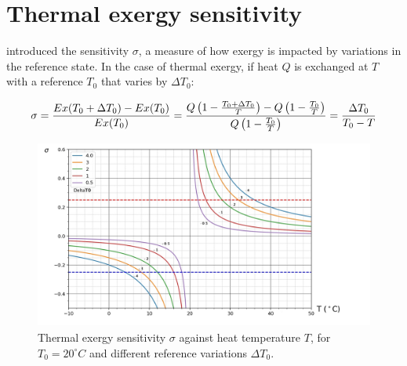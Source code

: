 \documentclass[10pt]{extarticle} %
\begin{document}
\section{Thermal exergy sensitivity} \label{sec:sensitivity}

\cite{Rosen2004} introduced the sensitivity $\sigma$, a measure of how exergy is impacted by variations in the reference state. In the case of thermal exergy, if heat $Q$ is exchanged at $T$ with a reference $T_0$ that varies by $\Delta T_0$: 





\vskip-0.1cm
\begin{equation}
\sigma =  {Ex(T_0+\Delta T_0)-Ex(T_0) \over Ex(T_0)} = { { Q \left( 1-{T_0+ \Delta T_0 \over T} \right) } - { Q \left( 1-{T_0 \over T} \right) } \over { Q \left( 1-{T_0 \over T} \right) } } = { \Delta T_0 \over T_0 - T }
\end{equation}

\vskip-0.2cm
\begin{figure}[h!]
\includegraphics[height=6.2cm, center]{images/sensitivity_2.jpg} 
\caption{Thermal exergy sensitivity $\sigma$ against heat temperature $T$, for $T_0 = 20^\circ C$ and different reference variations $\Delta T_0$.}
\label{fig:sensitivity}
\end{figure}
\end{document}
